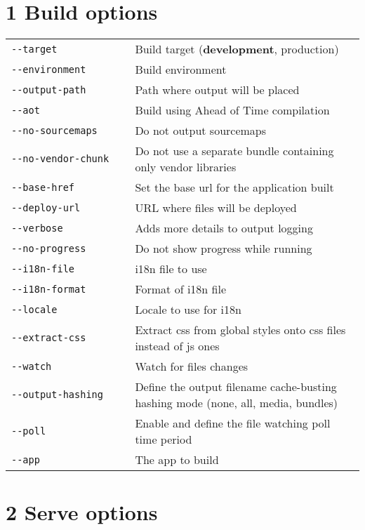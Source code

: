 \documentclass[8pt]{extarticle} %
\begin{document}
\begin{multicols}{3}
\section*{1 Build options}

  \begin{tabular}{L{0.35\linewidth} L{0.65\linewidth}}
    \tt -{}-target  & \small Build target ({\bf development}, production)\\
    \tt -{}-environment  & \small Build environment \\
    \tt -{}-output-path  & \small Path where output will be placed \\
    \tt -{}-aot & \small Build using Ahead of Time compilation \\
    \tt -{}-no-sourcemaps & \small Do not output sourcemaps \\
    \tt -{}-no-vendor-chunk & \small Do not use a separate bundle containing only vendor libraries \\
    \tt -{}-base-href  & \small Set the base url for the application built \\
    \tt -{}-deploy-url  & \small URL where files will be deployed \\
    \tt -{}-verbose & \small Adds more details to output logging \\
    \tt -{}-no-progress & \small Do not show progress while running \\
    \tt -{}-i18n-file  & \small i18n file to use \\
    \tt -{}-i18n-format  & \small Format of i18n file\\
    \tt -{}-locale  & \small Locale to use for i18n \\
    \tt -{}-extract-css & \small Extract css from global styles onto css files instead of js ones\\
    \tt -{}-watch & \small Watch for files changes \\
    \tt -{}-output-hashing  & \small Define the output filename cache-busting hashing mode (none, all, media, bundles)\\
    \tt -{}-poll  & \small Enable and define the file watching poll time period \\
    \tt -{}-app  & \small The app to build
  \end{tabular}

\section*{2 Serve options}



\end{multicols}
\end{document}
